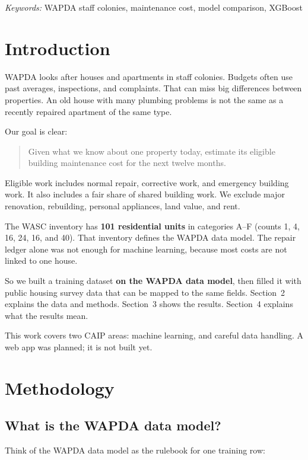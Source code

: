 \documentclass[11pt,a4paper]{article}
\begin{document}
\vspace{0.15em}
\noindent\textit{Keywords:} WAPDA staff colonies, maintenance cost, model comparison, XGBoost

\section{Introduction}

WAPDA looks after houses and apartments in staff colonies. Budgets often use past averages, inspections, and complaints. That can miss big differences between properties. An old house with many plumbing problems is not the same as a recently repaired apartment of the same type.

Our goal is clear:

\begin{quote}
Given what we know about one property today, estimate its eligible building maintenance cost for the next twelve months.
\end{quote}

Eligible work includes normal repair, corrective work, and emergency building work. It also includes a fair share of shared building work. We exclude major renovation, rebuilding, personal appliances, land value, and rent.

The WASC inventory has \textbf{101 residential units} in categories A--F (counts 1, 4, 16, 24, 16, and 40). That inventory defines the WAPDA data model. The repair ledger alone was not enough for machine learning, because most costs are not linked to one house.

So we built a training dataset \textbf{on the WAPDA data model}, then filled it with public housing survey data that can be mapped to the same fields. Section~2 explains the data and methods. Section~3 shows the results. Section~4 explains what the results mean.

This work covers two CAIP areas: machine learning, and careful data handling. A web app was planned; it is not built yet.

\section{Methodology}

\subsection{What is the WAPDA data model?}

Think of the WAPDA data model as the rulebook for one training row:
\end{document}
